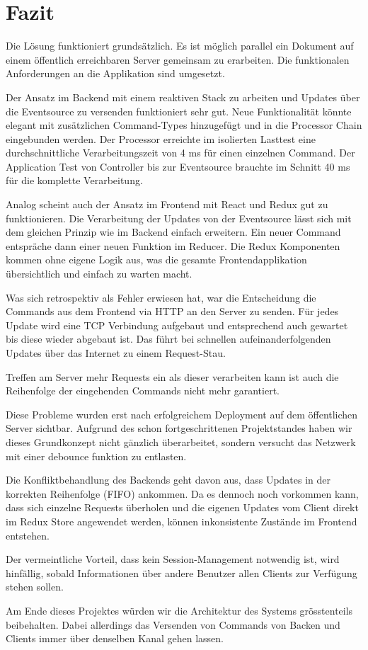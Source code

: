 \section{Fazit}

Die Lösung funktioniert grundsätzlich.
Es ist möglich parallel ein Dokument auf einem öffentlich erreichbaren Server gemeinsam zu erarbeiten.
Die funktionalen Anforderungen an die Applikation sind umgesetzt.

Der Ansatz im Backend mit einem reaktiven Stack zu arbeiten und Updates über die Eventsource zu versenden funktioniert sehr gut.
Neue Funktionalität könnte elegant mit zusätzlichen Command-Types hinzugefügt und in die Processor Chain eingebunden werden.
Der Processor erreichte im isolierten Lasttest eine durchschnittliche Verarbeitungszeit von 4 ms für einen einzelnen Command.
Der Application Test von Controller bis zur Eventsource brauchte im Schnitt 40 ms für die komplette Verarbeitung.

Analog scheint auch der Ansatz im Frontend mit React und Redux gut zu funktionieren.
Die Verarbeitung der Updates von der Eventsource lässt sich mit dem gleichen Prinzip wie im Backend einfach erweitern.
Ein neuer Command entspräche dann einer neuen Funktion im Reducer.
Die Redux Komponenten kommen ohne eigene Logik aus, was die gesamte Frontendapplikation übersichtlich und einfach zu warten macht.

Was sich retrospektiv als Fehler erwiesen hat, war die Entscheidung die Commands aus dem Frontend via HTTP an den Server zu senden.
Für jedes Update wird eine TCP Verbindung aufgebaut und entsprechend auch gewartet bis diese wieder abgebaut ist.
Das führt bei schnellen aufeinanderfolgenden Updates über das Internet zu einem Request-Stau.

Treffen am Server mehr Requests ein als dieser verarbeiten kann ist auch die Reihenfolge der eingehenden Commands nicht mehr garantiert.

Diese Probleme wurden erst nach erfolgreichem Deployment auf dem öffentlichen Server sichtbar.
Aufgrund des schon fortgeschrittenen Projektstandes haben wir dieses Grundkonzept nicht gänzlich überarbeitet, sondern versucht das Netzwerk mit einer debounce funktion zu entlasten.

Die Konfliktbehandlung des Backends geht davon aus, dass Updates in der korrekten Reihenfolge (FIFO) ankommen.
Da es dennoch noch vorkommen kann, dass sich einzelne Requests überholen und die eigenen Updates vom Client direkt im Redux Store angewendet werden, können inkonsistente Zustände im Frontend entstehen.

Der vermeintliche Vorteil, dass kein Session-Management notwendig ist, wird hinfällig, sobald Informationen über andere Benutzer allen Clients zur Verfügung stehen sollen.

Am Ende dieses Projektes würden wir die Architektur des Systems grösstenteils beibehalten.
Dabei allerdings das Versenden von Commands von Backen und Clients immer über denselben Kanal gehen lassen.
